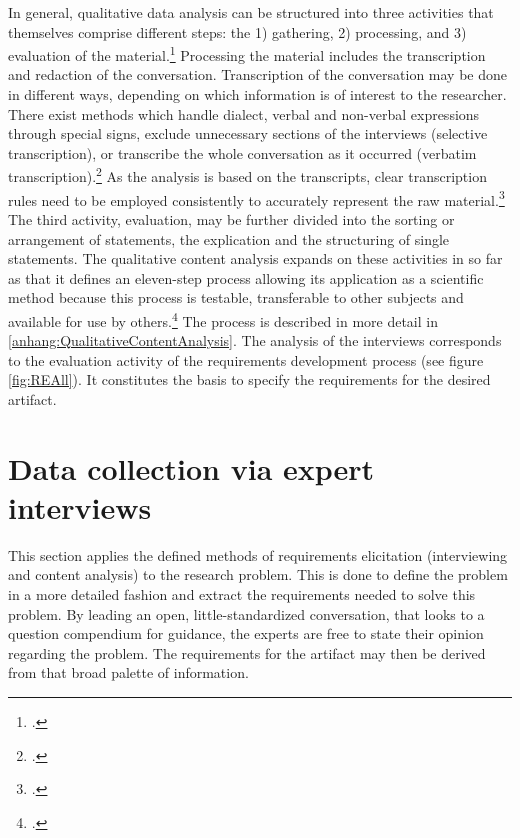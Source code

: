 In general, qualitative data analysis can be structured into three activities that themselves comprise different steps: the 1) gathering, 2) processing, and 3) evaluation of the material.\footcite[Cf.][p.135 et seqq]{KrugerqualitativeInhaltsanalyseMethode2004} Processing the material includes the transcription and redaction of the conversation. Transcription of the conversation may be done in different ways, depending on which information is of interest to the researcher. There exist methods which handle dialect, verbal and non-verbal expressions through special signs, exclude unnecessary sections of the interviews (selective transcription), or transcribe the whole conversation as it occurred (verbatim transcription).\footcite[Cf.][p.44 et seq]{MayringQualitativeContentAnalysis2014} As the analysis is based on the transcripts, clear transcription rules need to be employed consistently to accurately represent the raw material.\footcite[Cf.][p.44]{MayringQualitativeContentAnalysis2014} The third activity, evaluation, may be further divided into the sorting or arrangement of statements, the explication and the structuring of single statements. The qualitative content analysis expands on these activities in so far as that it defines an eleven-step process allowing its application as a scientific method because this process is testable, transferable to other subjects and available for use by others.\footcite[Cf.][p.53]{MayringQualitativeContentAnalysis2014} The process is described in more detail in \ref{anhang:QualitativeContentAnalysis}. The analysis of the interviews corresponds to the evaluation activity of the requirements development process (see figure \ref{fig:REAll}). It constitutes the basis to specify the requirements for the desired artifact. 

\section{Data collection via expert interviews}
This section applies the defined methods of requirements elicitation (interviewing and content analysis) to the research problem. This is done to define the problem in a more detailed fashion and extract the requirements needed to solve this problem. By leading an open, little-standardized conversation, that looks to a question compendium for guidance, the experts are free to state their opinion regarding the problem. The requirements for the artifact may then be derived from that broad palette of information.

